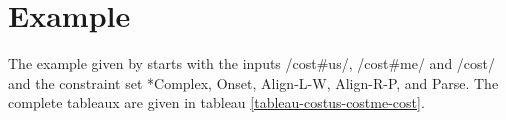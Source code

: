 \documentclass[11pt]{article}
\begin{document}
\section{Example}

The example given by  starts with the
inputs /cost\#us/, /cost\#me/ and /cost/ and the constraint set {\sc
  *Complex}, {\sc Onset}, {\sc Align-L-W}, {\sc Align-R-P}, and {\sc
  Parse}. The complete tableaux are given in tableau
\ref{tableau-costus-costme-cost}.
\end{document}
